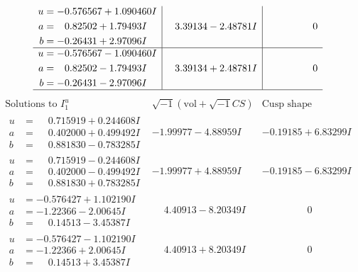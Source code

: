 \documentclass[1p]{elsarticle_modified}
\theoremstyle{definition}
\newcommand{\I}{\sqrt{-1}}
\begin{document}
$$\begin{array}{c|c|c}
\begin{aligned}
u &= -0.576567 + 1.090460 I \\
a &= \phantom{-}0.82502 + 1.79493 I \\
b &= -0.26431 + 2.97096 I\end{aligned}
 & \phantom{-}3.39134 - 2.48781 I & \phantom{-0.000000 } 0 \\ \hline\begin{aligned}
u &= -0.576567 - 1.090460 I \\
a &= \phantom{-}0.82502 - 1.79493 I \\
b &= -0.26431 - 2.97096 I\end{aligned}
 & \phantom{-}3.39134 + 2.48781 I & \phantom{-0.000000 } 0\\
 \hline 
 \end{array}$$\newpage$$\begin{array}{c|c|c}  
\text{Solutions to }I^u_{1}& \I (\text{vol} + \sqrt{-1}CS) & \text{Cusp shape}\\
 \hline 
\begin{aligned}
u &= \phantom{-}0.715919 + 0.244608 I \\
a &= \phantom{-}0.402000 + 0.499492 I \\
b &= \phantom{-}0.881830 - 0.783285 I\end{aligned}
 & -1.99977 - 4.88959 I & -0.19185 + 6.83299 I \\ \hline\begin{aligned}
u &= \phantom{-}0.715919 - 0.244608 I \\
a &= \phantom{-}0.402000 - 0.499492 I \\
b &= \phantom{-}0.881830 + 0.783285 I\end{aligned}
 & -1.99977 + 4.88959 I & -0.19185 - 6.83299 I \\ \hline\begin{aligned}
u &= -0.576427 + 1.102190 I \\
a &= -1.22366 - 2.00645 I \\
b &= \phantom{-}0.14513 - 3.45387 I\end{aligned}
 & \phantom{-}4.40913 - 8.20349 I & \phantom{-0.000000 } 0 \\ \hline\begin{aligned}
u &= -0.576427 - 1.102190 I \\
a &= -1.22366 + 2.00645 I \\
b &= \phantom{-}0.14513 + 3.45387 I\end{aligned}
 & \phantom{-}4.40913 + 8.20349 I & \phantom{-0.000000 } 0 \\ \hline\begin{aligned}

\end{aligned}
\end{array}$$
\end{document}
